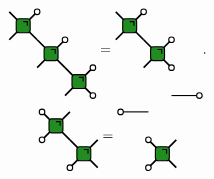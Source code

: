 \documentclass[a4paper,twocolumn,11pt,accepted=2024-02-08]{quantumarticle}
\theoremstyle{break}
\newcommand{\1}{\mathbbm{1}}
\theoremstyle{plain}
\theoremstyle{plain}
\theoremstyle{plain}
\newcommand{\Wgategreen}[2]{
\draw[very thick] (#1-0.5, #2 +0.5) -- (#1+0.5,#2-0.5);
\draw[very thick] (#1-0.5,#2-0.5) -- (#1+0.5,#2+0.5);
\draw[ thick, fill=mygreen, rounded corners=2pt] (#1-0.25,#2+0.25) rectangle (#1+0.25,#2-0.25);
\draw[thick] (#1,#2+0.15) -- (#1+0.15,#2+0.15) -- (#1+0.15,#2);
}
\newcommand{\MYcircle}[2]{
\draw[thick, fill=white] (#1,#2) circle (0.1cm); }
\begin{document}
\begin{equation}
    \begin{tikzpicture}[baseline=(current  bounding  box.center), scale=0.7]
    \Wgategreen{-1.5}{0.5}
    \Wgategreen{-0.5}{-0.5}
    \Wgategreen{-2.5}{1.5}
    \MYcircle{-1}{1}
    \MYcircle{0}{0}
    \MYcircle{0}{-1}
    \MYcircle{-2}{2}
    \end{tikzpicture}
    =
    \begin{tikzpicture}[baseline=(current  bounding  box.center), scale=0.7]
    \Wgategreen{-1.5}{0.5}
    \Wgategreen{-2.5}{1.5}
    \draw[thick] (-1,-1)--(0,-1);
    \MYcircle{0}{-1}
    \MYcircle{-1}{0}
    \MYcircle{-1}{1}
    \MYcircle{-2}{2}
    \end{tikzpicture}
    .\label{eq:3rdHierarchydefinition}
\end{equation}
\begin{equation}
    \begin{tikzpicture}[baseline=(current  bounding  box.center), scale=0.7]
        \Wgategreen{-0.5}{0.5}
        \Wgategreen{0.5}{-0.5}
        \MYcircle{-1}{1}
        \MYcircle{-1}{0}
        \MYcircle{0}{-1}
        \end{tikzpicture}
        =
        \begin{tikzpicture}[baseline=(current  bounding  box.center), scale=0.7]
        \Wgategreen{0.5}{-0.5}
        \draw[thick] (0,1)--(-1,1);
        \MYcircle{-1}{1}
        \MYcircle{0}{0}
        \MYcircle{0}{-1}
        \end{tikzpicture}
\end{equation}
\end{document}
